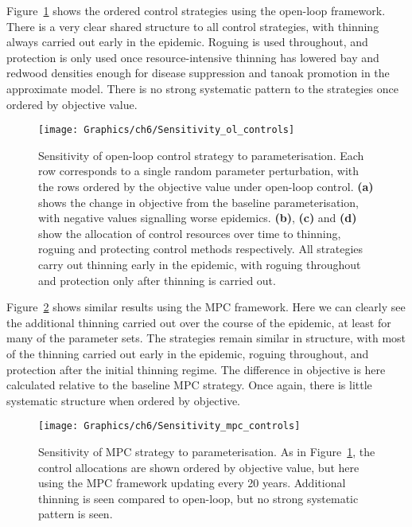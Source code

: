 Figure~\ref{fig:ch6:ol_sensitivity} shows the ordered control strategies using the open-loop framework. There is a very clear shared structure to all control strategies, with thinning always carried out early in the epidemic. Roguing is used throughout, and protection is only used once resource-intensive thinning has lowered bay and redwood densities enough for disease suppression and tanoak promotion in the approximate model. There is no strong systematic pattern to the strategies once ordered by objective value.

\begin{figure}
    \begin{center}
        \texttt{[image: Graphics/ch6/Sensitivity\_ol\_controls]}
        \caption[Open-loop control parameter sensitivity]{Sensitivity of open-loop control strategy to parameterisation. Each row corresponds to a single random parameter perturbation, with the rows ordered by the objective value under open-loop control. \textbf{(a)} shows the change in objective from the baseline parameterisation, with negative values signalling worse epidemics. \textbf{(b)}, \textbf{(c)} and \textbf{(d)} show the allocation of control resources over time to thinning, roguing and protecting control methods respectively. All strategies carry out thinning early in the epidemic, with roguing throughout and protection only after thinning is carried out.\label{fig:ch6:ol_sensitivity}}
    \end{center}
\end{figure}

Figure~\ref{fig:ch6:mpc_sensitivity} shows similar results using the MPC framework. Here we can clearly see the additional thinning carried out over the course of the epidemic, at least for many of the parameter sets. The strategies remain similar in structure, with most of the thinning carried out early in the epidemic, roguing throughout, and protection after the initial thinning regime. The difference in objective is here calculated relative to the baseline MPC strategy. Once again, there is little systematic structure when ordered by objective.

\begin{figure}[t]
    \begin{center}
        \texttt{[image: Graphics/ch6/Sensitivity\_mpc\_controls]}
        \caption[MPC strategy parameter sensitivity]{Sensitivity of MPC strategy to parameterisation. As in Figure~\ref{fig:ch6:ol_sensitivity}, the control allocations are shown ordered by objective value, but here using the MPC framework updating every 20 years. Additional thinning is seen compared to open-loop, but no strong systematic pattern is seen.\label{fig:ch6:mpc_sensitivity}}
    \end{center}
\end{figure}


